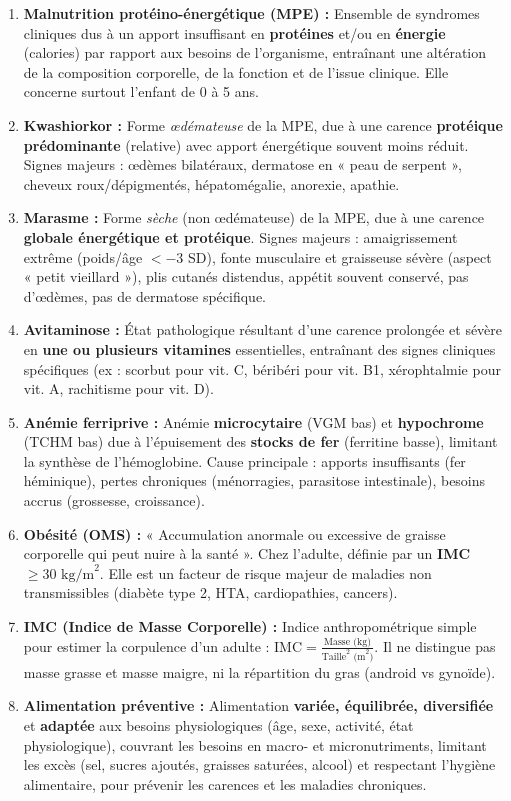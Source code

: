 \documentclass[11pt]{article}
\begin{document}
\begin{corrige}
\begin{enumerate}
    \item \textbf{Malnutrition protéino-énergétique (MPE) :} Ensemble de syndromes cliniques dus à un apport insuffisant en \textbf{protéines} et/ou en \textbf{énergie} (calories) par rapport aux besoins de l'organisme, entraînant une altération de la composition corporelle, de la fonction et de l'issue clinique. Elle concerne surtout l'enfant de 0 à 5 ans.
    \item \textbf{Kwashiorkor :} Forme \emph{œdémateuse} de la MPE, due à une carence \textbf{protéique prédominante} (relative) avec apport énergétique souvent moins réduit. Signes majeurs : œdèmes bilatéraux, dermatose en « peau de serpent », cheveux roux/dépigmentés, hépatomégalie, anorexie, apathie.
    \item \textbf{Marasme :} Forme \emph{sèche} (non œdémateuse) de la MPE, due à une carence \textbf{globale énergétique et protéique}. Signes majeurs : amaigrissement extrême (poids/âge $< -3$ SD), fonte musculaire et graisseuse sévère (aspect « petit vieillard »), plis cutanés distendus, appétit souvent conservé, pas d'œdèmes, pas de dermatose spécifique.
    \item \textbf{Avitaminose :} État pathologique résultant d'une carence prolongée et sévère en \textbf{une ou plusieurs vitamines} essentielles, entraînant des signes cliniques spécifiques (ex : scorbut pour vit. C, béribéri pour vit. B1, xérophtalmie pour vit. A, rachitisme pour vit. D).
    \item \textbf{Anémie ferriprive :} Anémie \textbf{microcytaire} (VGM bas) et \textbf{hypochrome} (TCHM bas) due à l'épuisement des \textbf{stocks de fer} (ferritine basse), limitant la synthèse de l'hémoglobine. Cause principale : apports insuffisants (fer héminique), pertes chroniques (ménorragies, parasitose intestinale), besoins accrus (grossesse, croissance).
    \item \textbf{Obésité (OMS) :} « Accumulation anormale ou excessive de graisse corporelle qui peut nuire à la santé ». Chez l'adulte, définie par un \textbf{IMC $\ge 30 \text{ kg/m}^2$}. Elle est un facteur de risque majeur de maladies non transmissibles (diabète type 2, HTA, cardiopathies, cancers).
    \item \textbf{IMC (Indice de Masse Corporelle) :} Indice anthropométrique simple pour estimer la corpulence d'un adulte : $\text{IMC} = \frac{\text{Masse (kg)}}{\text{Taille}^2 \text{ (m}^2\text{)}}$. Il ne distingue pas masse grasse et masse maigre, ni la répartition du gras (android vs gynoïde).
    \item \textbf{Alimentation préventive :} Alimentation \textbf{variée, équilibrée, diversifiée} et \textbf{adaptée} aux besoins physiologiques (âge, sexe, activité, état physiologique), couvrant les besoins en macro- et micronutriments, limitant les excès (sel, sucres ajoutés, graisses saturées, alcool) et respectant l'hygiène alimentaire, pour prévenir les carences et les maladies chroniques.
\end{enumerate}
\end{corrige}
\end{document}
